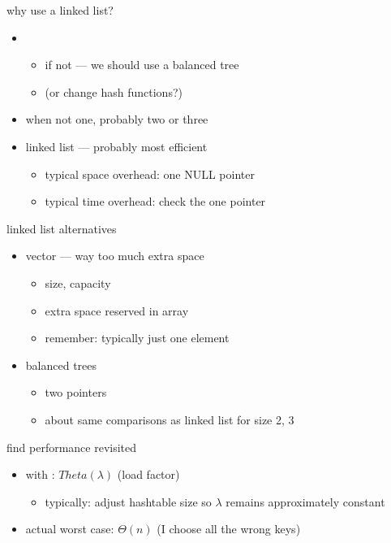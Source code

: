 \begin{frame}{why use a linked list?}
\begin{itemize}
\item {}
\begin{itemize}
    \item if not --- we should use a balanced tree
    \item (or change hash functions?)
\end{itemize}
\item when not one, probably two or three
\item linked list --- probably most efficient
\begin{itemize}
    \item typical space overhead: one NULL pointer
    \item typical time overhead: check the one pointer
\end{itemize}
\end{itemize}
\end{frame}

\begin{frame}{linked list alternatives}
\begin{itemize}
\item vector --- way too much extra space
    \begin{itemize}
    \item size, capacity
    \item extra space reserved in array
    \item remember: typically just one element
    \end{itemize}
\item balanced trees
    \begin{itemize}
    \item two pointers
    \item about same comparisons as linked list for size 2, 3
    \end{itemize}
\end{itemize}
\end{frame}

\begin{frame}{find performance revisited}
\begin{itemize}
\item with : $Theta(\lambda)$ (load factor)
    \begin{itemize}
    \item typically: adjust hashtable size so $\lambda$ remains approximately constant
    \end{itemize}
\item actual worst case: $\Theta(n)$ (I choose all the wrong keys)
\end{itemize}
\end{frame}


